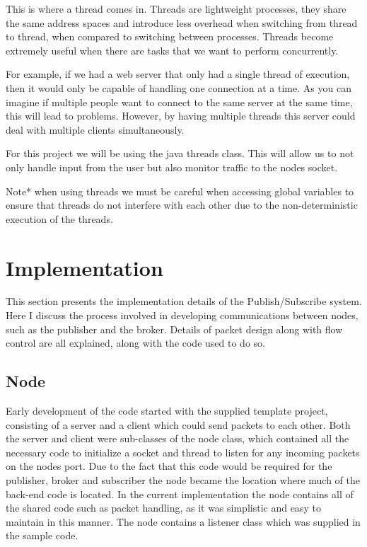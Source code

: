 \documentclass{article}
\begin{document}
This is where a thread comes in. Threads are lightweight processes, they share the same address spaces and introduce less overhead when switching from thread to thread, when compared to switching between processes. Threads become extremely useful when there are tasks that we want to perform concurrently.

For example, if we had a web server that only had a single thread of execution, then it would only be capable of handling one connection at a time. As you can imagine if multiple people want to connect to the same server at the same time, this will lead to problems. However, by having multiple threads this server could deal with multiple clients simultaneously.

For this project we will be using the java threads class. This will allow us to not only handle input from the user but also monitor traffic to the nodes socket. 

Note* when using threads we must be careful when accessing global variables to ensure that threads do not interfere with each other due to the non-deterministic execution of the threads.

\pagebreak


\section{Implementation}
\label{sec:Implementation}

This section presents the implementation details of the Publish/Subscribe system. Here I discuss the process involved in developing communications between nodes, such as the publisher and the broker. Details of packet design along with flow control are all explained, along with the code used to do so.

\subsection{Node}

Early development of the code started with the supplied template project, consisting of a server and a client which could send packets to each other. Both the server and client were sub-classes of the node class, which contained all the necessary code to initialize a socket and thread to listen for any incoming packets on the nodes port. Due to the fact that this code would be required for the publisher, broker and subscriber the node became the location where much of the back-end code is located. In the current implementation the node contains all of the shared code such as packet handling, as it was simplistic and easy to maintain in this manner.
\newline
\newline
The node contains a listener class which was supplied in the sample code. 
\end{document}
